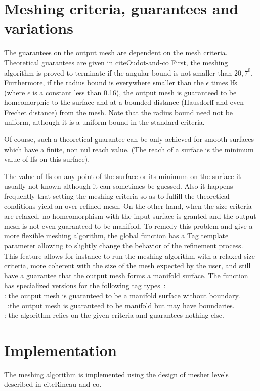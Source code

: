 \section{Meshing criteria, guarantees and variations}
\label{SurfaceMesher_section_criteria}
\label{SurfaceMesher_section_variations}

The guarantees on the output mesh are dependent on the mesh criteria.
Theoretical guarantees are given in cite{Oudot-and-co}
First, the meshing algorithm is proved to terminate 
if the angular bound is
not smaller than $20,7^0$. 
Furthermore, if the radius bound is everywhere smaller than 
the $\epsilon$ times lfs  (where $\epsilon$ is a constant
less than 0.16),  the output mesh 
is guaranteed to be homeomorphic to the surface
and at a bounded distance (Hausdorff and even Frechet distance)
from the mesh.
Note that the radius bound need not be uniform,
although it is a uniform bound in the standard criteria.

Of course, such a theoretical guarantee can be only achieved
for smooth surfaces which have a finite, non nul
reach value. (The reach of a surface is the minimum value of lfs on
this surface).

The value of lfs on any point of the surface
or its minimum on the surface it usually not known
although it can sometimes be guessed. Also it happens frequently
that setting the meshing criteria so as to fulfill the theoretical
conditions yield an over refined mesh.
On the other hand, when the size criteria are relaxed,
no homeomorphism with the input surface is granted
and the output mesh is not even guaranteed to be manifold.
To remedy this problem and give a more flexible
meshing algorithm, the global function 
 has a Tag template parameter
allowing to slightly change the behavior of the refinement process.
This feature allows for instance to run the meshing
algorithm with a relaxed size criteria, more coherent
with the size of the mesh expected by the user,
and still have a guarantee that
the output mesh forms a manifold surface.
The function  has specialized versions
for the following  tag types~: \\
 : the output mesh is guaranteed to be a manifold
surface without boundary.\\
~:the output mesh is guaranteed to be
manifold but may have boundaries.\\
 : the algorithm relies on the given criteria and
guarantees nothing else.

\section{Implementation}

The meshing algorithm is implemented using the design of mesher levels
described in cite{Rineau-and-co}. 




